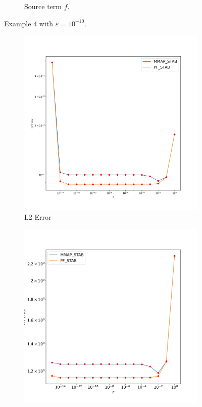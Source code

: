 \documentclass[12pt]{ociamthesis}
\begin{document}
\begin{figure}[H]
\begin{subfigure}{0.5\textwidth}
     \caption{Source term $f$.}
 \end{subfigure}
 \caption{Example $4$ with $\varepsilon = 10^{-10}$.} \label{E4_uf}
\end{figure}

\begin{figure}[H]
 \begin{subfigure}{0.5\textwidth}
     \includegraphics[width=\textwidth]{Pics/LHSims/E4/E4_STABL2.png}
     \caption{L2 Error}
 \end{subfigure}
   \begin{subfigure}{0.5\textwidth}
     \includegraphics[width=\textwidth]{Pics/LHSims/E4/E4_STABH1.png}

\end{subfigure}
\end{figure}
\end{document}
